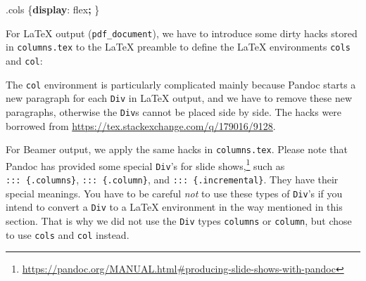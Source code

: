 \documentclass[
  11pt,
]{krantz}
\newenvironment{Shaded}{\begin{snugshade}}{\end{snugshade}}
\newcommand{\CommentTok}[1]{\textcolor[rgb]{0.37,0.37,0.37}{\textit{#1}}}
\newcommand{\ExtensionTok}[1]{#1}
\newcommand{\FunctionTok}[1]{\textcolor[rgb]{0,0,0}{#1}}
\newcommand{\KeywordTok}[1]{\textcolor[rgb]{0.27,0.27,0.27}{\textbf{#1}}}
\newcommand{\NormalTok}[1]{#1}
\newcommand{\OperatorTok}[1]{\textcolor[rgb]{0.43,0.43,0.43}{\textbf{#1}}}
\renewcommand{\href}[2]{#2\footnote{\url{#1}}}
\begin{document}
\begin{Shaded}
\begin{Highlighting}[]
\FunctionTok{.cols}\NormalTok{ \{}\KeywordTok{display}\NormalTok{: flex}\OperatorTok{;}\NormalTok{ \}}
\end{Highlighting}
\end{Shaded}

For LaTeX output (\texttt{pdf\_document}), we have to introduce some dirty hacks stored in \texttt{columns.tex} to the LaTeX preamble to define the LaTeX environments \texttt{cols} and \texttt{col}:

\begin{Shaded}
\end{Shaded}

The \texttt{col} environment is particularly complicated mainly because Pandoc starts a new paragraph for each \texttt{Div} in LaTeX output, and we have to remove these new paragraphs, otherwise the \texttt{Div}s cannot be placed side by side. The hacks were borrowed from \url{https://tex.stackexchange.com/q/179016/9128}.

For Beamer output, we apply the same hacks in \texttt{columns.tex}. Please note that Pandoc has provided some special \texttt{Div}'s for \href{https://pandoc.org/MANUAL.html\#producing-slide-shows-with-pandoc}{slide shows,} such as \texttt{:::\ \{.columns\}}, \texttt{:::\ \{.column\}}, and \texttt{:::\ \{.incremental\}}. They have their special meanings. You have to be careful \emph{not} to use these types of \texttt{Div}'s if you intend to convert a \texttt{Div} to a LaTeX environment in the way mentioned in this section. That is why we did not use the \texttt{Div} types \texttt{columns} or \texttt{column}, but chose to use \texttt{cols} and \texttt{col} instead.
\end{document}
